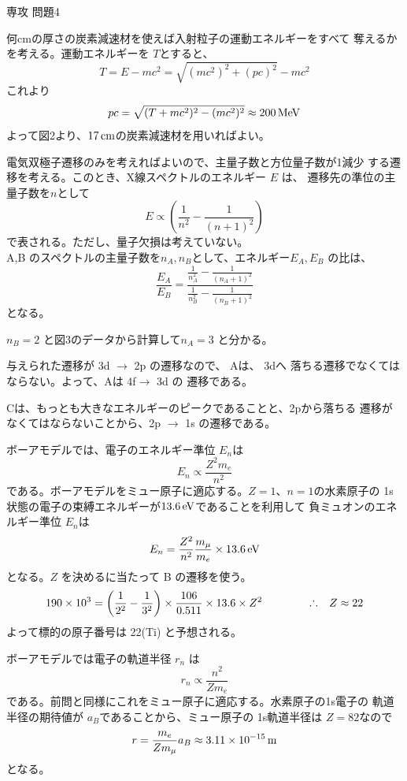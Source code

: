\documentclass[fleqn]{jbook}
\begin{document}
\begin{answer}{専攻 問題4}{}

\begin{subanswers}
\SubAnswer
  何cmの厚さの炭素減速材を使えば入射粒子の運動エネルギーをすべて
  奪えるかを考える。運動エネルギーを $T$とすると、
%
  \[ T = E - m c^2 = \sqrt{(mc^2 )^2 + (pc)^2} - mc^2 \]
%
  これより
%
  \[ pc = \sqrt{(T+mc^2)^2 - (mc^2)^2} \approx 200 \,{\rm MeV} \]
%
  よって図2より、$17\,{\rm cm}$の炭素減速材を用いればよい。


\SubAnswer
  電気双極子遷移のみを考えればよいので、主量子数と方位量子数が1減少
  する遷移を考える。このとき、X線スペクトルのエネルギー $E$ は、
  遷移先の準位の主量子数を$n$として
%
  \[ E \propto \left(\frac{1}{n^2} - \frac{1}{(n+1)^2} \right) \]
%
  で表される。ただし、量子欠損は考えていない。\\
%
  A,B のスペクトルの主量子数を$n_A,n_B$として、エネルギー$E_A, E_B$
  の比は、
%
  \[ \frac{E_A}{E_B} = \frac{\frac{1}{n_A^ 2} - \frac{1}{(n_A +1)^2}}%
     {\frac{1}{n_B^2} - \frac{1}{(n_B+1)^2} } \]
%
  となる。

  $n_B=2$ と図3のデータから計算して$n_A=3$ と分かる。

  与えられた遷移が 3d $\rightarrow$ 2p の遷移なので、 Aは、 3dへ
  落ちる遷移でなくてはならない。よって、Aは 4f$\rightarrow$ 3d の
  遷移である。

  Cは、もっとも大きなエネルギーのピークであることと、2pから落ちる
  遷移がなくてはならないことから、2p $\rightarrow$ 1s の遷移である。



\SubAnswer
  ボーアモデルでは、電子のエネルギー準位 $E_n$は
%
  \[ E_n \propto \frac{Z^2 m_e}{n^2} \]
%
  である。ボーアモデルをミュー原子に適応する。$Z=1$、$n=1$の水素原子の
  1s状態の電子の束縛エネルギーが$13.6\,{\rm eV}$であることを利用して
  負ミュオンのエネルギー準位 $E_n$は
%
  \[ E_n = \frac{Z^2}{n^2}\frac{m_\mu}{m_e} \times 13.6 \,{\rm eV} \]
%
  となる。$Z$ を決めるに当たって B の遷移を使う。
%
  \[ 190 \Keta{3} = \left( \frac{1}{2^2} - \frac{1}{3^2} \right)%
                    \times \frac{106}{0.511} \times 13.6 \times Z^2 \hspace{15mm}%
               \Yueni Z \approx 22 \]
%
  よって標的の原子番号は 22(Ti) と予想される。



\newpage
\SubAnswer
  ボーアモデルでは電子の軌道半径 $r_n$ は
%
  \[ r_n \propto \frac{n^2}{Z m_e} \]
%
  である。前問と同様にこれをミュー原子に適応する。水素原子の1s電子の
  軌道半径の期待値が $a_B$であることから、ミュー原子の 1s軌道半径は
  $Z=82$なので
%
  \[ r = \frac{m_e}{Zm_\mu} a_B \approx 3.11 \times 10^{-15}\,{\rm m} \]
%
  となる。


\end{subanswers}
\end{answer}
\end{document}
